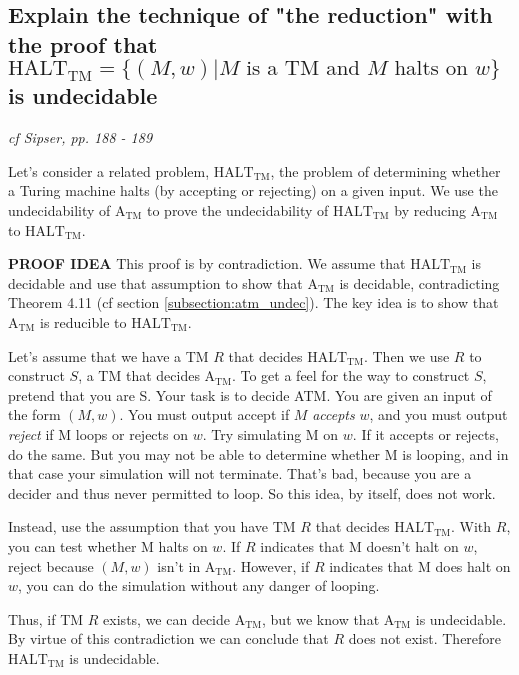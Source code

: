 \documentclass[main.tex]{subfiles}
\begin{document}
\subsection{Explain the technique of "the reduction" with the proof that $\text{HALT}_\text{TM} = \{(M, w) | M \text{ is a TM and } M \text{ halts on } w\}$ is undecidable}
\emph{cf Sipser, pp. 188 - 189}


Let's consider a related
problem, $\text{HALT}_\text{TM}$, the problem of determining whether a Turing machine halts
(by accepting or rejecting) on a given input. We use the undecidability of $\text{A}_\text{TM}$
to prove the undecidability of $\text{HALT}_\text{TM}$ by reducing $\text{A}_\text{TM}$ to $\text{HALT}_\text{TM}$.

\par\textbf{PROOF IDEA}
This proof is by contradiction. We assume that $\text{HALT}_\text{TM}$ is
decidable and use that assumption to show that $\text{A}_\text{TM}$ is decidable, contradicting Theorem 4.11 (cf section \ref{subsection:atm_undec}). The key idea is to show that $\text{A}_\text{TM}$ is reducible to $\text{HALT}_\text{TM}$.
\par Let's assume that we have a TM $R$ that decides $\text{HALT}_\text{TM}$. Then we use $R$ to
construct $S$, a TM that decides $\text{A}_\text{TM}$. To get a feel for the way to construct $S$,
pretend that you are S. Your task is to decide ATM. You are given an input of
the form $(M, w)$. You must output accept if $M$ \emph{accepts} $w$, and you must output \emph{reject} if M loops or rejects on $w$. Try simulating M on $w$. If it accepts or rejects,
do the same. But you may not be able to determine whether M is looping, and
in that case your simulation will not terminate. That's bad, because you are a
decider and thus never permitted to loop. So this idea, by itself, does not work.
\par Instead, use the assumption that you have TM $R$ that decides $\text{HALT}_\text{TM}$. With
$R$, you can test whether M halts on $w$. If $R$ indicates that M doesn't halt on $w$,
reject because $(M, w)$ isn't in $\text{A}_\text{TM}$. However, if $R$ indicates that M does halt on
$w$, you can do the simulation without any danger of looping.
\par Thus, if TM $R$ exists, we can decide $\text{A}_\text{TM}$, but we know that $\text{A}_\text{TM}$ is undecidable. By virtue of this contradiction we can conclude that $R$ does not exist.
Therefore $\text{HALT}_\text{TM}$ is undecidable.
\end{document}
